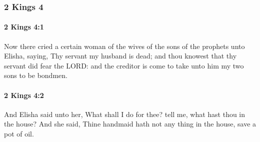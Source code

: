 	\subsubsection{2 Kings 4} %
		\label{2KINGS-4}

		\paragraph{2 Kings 4:1} %
			\label{2KINGS-4-1}

			Now there cried a certain woman of the wives of the sons of the prophets unto Elisha, saying, Thy servant my husband is dead; and thou knowest that thy servant did fear the LORD: and the creditor is come to take unto him my two sons to be bondmen.


		\paragraph{2 Kings 4:2} %
			\label{2KINGS-4-2}

			And Elisha said unto her, What shall I do for thee? tell me, what hast thou in the house? And she said, Thine handmaid hath not any thing in the house, save a pot of oil.

